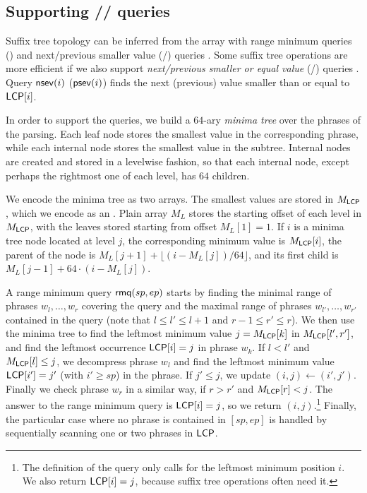 \subsection{Supporting \nsv/\psv/\rmq{} queries}

Suffix tree topology can be inferred from the \LCP{} array with range minimum
queries (\rmq) and next/previous smaller value (\nsv/\psv) queries
\cite{Fischer2009a}. Some suffix tree operations are more efficient
if we also support \emph{next/previous smaller or equal value} (\nsev/\psev)
queries \cite{Abeliuk2013}. Query $\mathsf{nsev}(i)$ ($\mathsf{psev}(i)$) finds the next
(previous) value smaller than or equal to $\mathsf{LCP}[i]$.

In order to support the queries, we build a $64$-ary \emph{minima tree} over
the phrases of the \RLZ{} parsing. Each leaf node stores the smallest \LCP{}
value in the corresponding phrase, while each internal node stores the
smallest value in the subtree. Internal nodes are created and stored in a
levelwise fashion, so that each internal node, except perhaps the rightmost
one of each level, has $64$ children.

We encode the minima tree as two arrays. The smallest \LCP{} values are
stored in $M_{\mathsf{LCP}}$, which we encode as an \slarray. Plain array $M_{L}$
stores the starting offset of each level in $M_{\mathsf{LCP}}$, with the leaves
stored starting from offset $M_{L}[1] = 1$. If $i$ is a minima tree node
located at level $j$, the corresponding minimum value is $M_{\mathsf{LCP}}[i]$, the
parent of the node is $M_{L}[j+1] + \lfloor (i - M_{L}[j]) / 64 \rfloor$,
and its first child is $M_{L}[j-1] + 64 \cdot (i - M_{L}[j])$.

A range minimum query $\mathsf{rmq}(sp,ep)$ starts by finding the minimal range of
phrases $w_{l}, \dotsc, w_{r}$ covering the query and the maximal range of
phrases $w_{l'}, \dotsc, w_{r'}$ contained in the query (note that $l \le l' \le
l+1$ and $r-1 \le r' \le r$). We then use the
minima tree to find the leftmost minimum value $j = M_{\mathsf{LCP}}[k]$ in
$M_{\mathsf{LCP}}[l',r']$, and find the leftmost occurrence $\mathsf{LCP}[i] = j$ in phrase
$w_{k}$. If $l < l'$ and $M_{\mathsf{LCP}}[l] \le j$, we decompress phrase $w_{l}$
and find the leftmost minimum value $\mathsf{LCP}[i'] = j'$ (with $i' \ge sp$) in the
phrase. If $j' \le j$, we update $(i,j) \leftarrow (i',j')$. Finally we check
phrase $w_{r}$ in a similar way, if $r > r'$ and $M_{\mathsf{LCP}}[r] < j$. The answer
to the range minimum query is $\mathsf{LCP}[i] = j$, so we return
$(i,j)$.\footnote{The definition of the query only calls for the leftmost
minimum position $i$. We also return $\mathsf{LCP}[i] = j$, because suffix tree
operations often need it.} Finally, the particular case where no phrase is
contained in $[sp,ep]$ is handled by sequentially scanning one or two phrases
in $\textsf{LCP}$.

